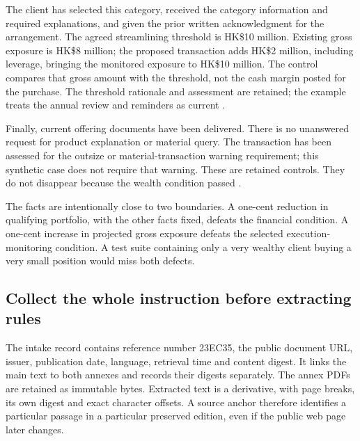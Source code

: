 
The client has selected this category, received the category information and
required explanations, and given the prior written acknowledgment for the
arrangement. The agreed streamlining threshold is HK\$10 million. Existing
gross exposure is HK\$8 million; the proposed transaction adds HK\$2 million,
including leverage, bringing the monitored exposure to HK\$10 million. The
control compares that gross amount with the threshold, not the cash margin
posted for the purchase. The threshold rationale and assessment are retained;
the example treats the annual review and reminders as current
\citep[Annex 1, paras.~6--8, 12--14; Annex 2, FAQ~7]{sfcspiannex1,sfcspiannex2}.

Finally, current offering documents have been delivered. There is no unanswered
request for product explanation or material query. The transaction has been
assessed for the outsize or material-transaction warning requirement; this
synthetic case does not require that warning. These are retained controls.
They do not disappear because the wealth condition passed
\citep[Annex 1, paras.~8.4, 10.3]{sfcspiannex1}.

The facts are intentionally close to two boundaries. A one-cent reduction in
qualifying portfolio, with the other facts fixed, defeats the financial
condition. A one-cent increase in projected gross exposure defeats the selected
execution-monitoring condition. A test suite containing only a very wealthy
client buying a very small position would miss both defects.

\subsection{Collect the whole instruction before extracting rules}
\label{merge:P-01b-complete-dry-run:02}


The intake record contains reference number 23EC35, the public document URL,
issuer, publication date, language, retrieval time and content digest. It
links the main text to both annexes and records their digests separately.
The annex PDFs are retained as immutable bytes. Extracted text is a derivative,
with page breaks, its own digest and exact character offsets. A source anchor
therefore identifies a particular passage in a particular preserved edition,
even if the public web page later changes.

